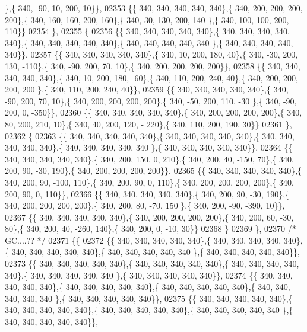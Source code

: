 \begin{DoxyCode}
      \},\{ 340, -90,  10, 200,  10\}\},
02353 \{\{ 340, 340, 340, 340, 340\},\{ 340, 200, 200, 200, 200\},\{ 340, 160, 160, 200, 160\},\{ 340,  30, 130, 200, 140
      \},\{ 340, 100, 100, 200, 110\}\}
02354 \},
02355 \{
02356 \{\{ 340, 340, 340, 340, 340\},\{ 340, 340, 340, 340, 340\},\{ 340, 340, 340, 340, 340\},\{ 340, 340, 340, 340, 340
      \},\{ 340, 340, 340, 340, 340\}\},
02357 \{\{ 340, 340, 340, 340, 340\},\{ 340,  10, 200, 180,  40\},\{ 340, -30, 200, 130, -110\},\{ 340, -90, 200,  70,  
      10\},\{ 340, 200, 200, 200, 200\}\},
02358 \{\{ 340, 340, 340, 340, 340\},\{ 340,  10, 200, 180, -60\},\{ 340, 110, 200, 240,  40\},\{ 340, 200, 200, 200, 200
      \},\{ 340, 110, 200, 240,  40\}\},
02359 \{\{ 340, 340, 340, 340, 340\},\{ 340, -90, 200,  70,  10\},\{ 340, 200, 200, 200, 200\},\{ 340, -50, 200, 110, -30
      \},\{ 340, -90, 200,   0, -350\}\},
02360 \{\{ 340, 340, 340, 340, 340\},\{ 340, 200, 200, 200, 200\},\{ 340,  80, 200, 210,  10\},\{ 340,  40, 200, 120, -
      220\},\{ 340, 110, 200, 190,  30\}\}
02361 \},
02362 \{
02363 \{\{ 340, 340, 340, 340, 340\},\{ 340, 340, 340, 340, 340\},\{ 340, 340, 340, 340, 340\},\{ 340, 340, 340, 340, 340
      \},\{ 340, 340, 340, 340, 340\}\},
02364 \{\{ 340, 340, 340, 340, 340\},\{ 340, 200, 150,   0, 210\},\{ 340, 200,  40, -150,  70\},\{ 340, 200,  90, -30, 
      190\},\{ 340, 200, 200, 200, 200\}\},
02365 \{\{ 340, 340, 340, 340, 340\},\{ 340, 200,  90, -100, 110\},\{ 340, 200,  90,   0, 110\},\{ 340, 200, 200, 200, 
      200\},\{ 340, 200,  90,   0, 110\}\},
02366 \{\{ 340, 340, 340, 340, 340\},\{ 340, 200,  90, -30, 190\},\{ 340, 200, 200, 200, 200\},\{ 340, 200,  80, -70, 150
      \},\{ 340, 200, -90, -390,  10\}\},
02367 \{\{ 340, 340, 340, 340, 340\},\{ 340, 200, 200, 200, 200\},\{ 340, 200,  60, -30,  80\},\{ 340, 200,  40, -260, 
      140\},\{ 340, 200,   0, -10,  30\}\}
02368 \}
02369 \},
02370 \textcolor{comment}{/* GC....?? */}
02371 \{\{
02372 \{\{ 340, 340, 340, 340, 340\},\{ 340, 340, 340, 340, 340\},\{ 340, 340, 340, 340, 340\},\{ 340, 340, 340, 340, 340
      \},\{ 340, 340, 340, 340, 340\}\},
02373 \{\{ 340, 340, 340, 340, 340\},\{ 340, 340, 340, 340, 340\},\{ 340, 340, 340, 340, 340\},\{ 340, 340, 340, 340, 340
      \},\{ 340, 340, 340, 340, 340\}\},
02374 \{\{ 340, 340, 340, 340, 340\},\{ 340, 340, 340, 340, 340\},\{ 340, 340, 340, 340, 340\},\{ 340, 340, 340, 340, 340
      \},\{ 340, 340, 340, 340, 340\}\},
02375 \{\{ 340, 340, 340, 340, 340\},\{ 340, 340, 340, 340, 340\},\{ 340, 340, 340, 340, 340\},\{ 340, 340, 340, 340, 340
      \},\{ 340, 340, 340, 340, 340\}\},

\end{DoxyCode}
